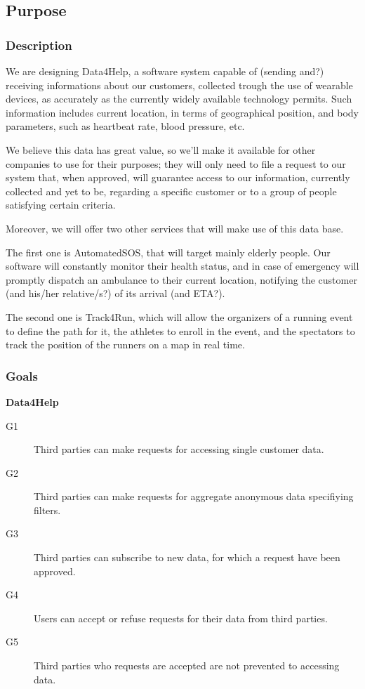 \documentclass[../main.tex]{subfiles}
\begin{document}
\subsection{Purpose}

\subsubsection{Description}
We are designing Data4Help, a software system capable of (sending and?) receiving informations about our customers, collected trough the use of wearable devices, as accurately as the currently widely available technology permits.
Such information includes current location, in terms of geographical position, and body parameters, such as heartbeat rate, blood pressure, etc.

We believe this data has great value, so we'll make it available for other companies to use for their purposes; they will only need to file a request to our system that, when approved, will guarantee access to our information, currently collected and yet to be, regarding a specific customer or to a group of people satisfying certain criteria.

Moreover, we will offer two other services that will make use of this data base.

The first one is AutomatedSOS, that will target mainly elderly people. Our software will constantly monitor their health status, and in case of emergency will promptly dispatch an ambulance to their current location, notifying the customer (and his/her relative/s?) of its arrival (and ETA?).

The second one is Track4Run, which will allow the organizers of a running event to define the path for it, the athletes to enroll in the event, and the spectators to track the position of the runners on a map in real time.


\subsubsection{Goals}


{\bf Data4Help}
\begin{description}
	\item [G1]  Third parties can make requests for accessing single customer data.
	\item [G2]  Third parties can make requests for aggregate anonymous data specifiying filters.
	\item [G3]	Third parties can subscribe to new data, for which a request have been approved.
	\item [G4]  Users can accept or refuse requests for their data from third parties.  
	\item [G5]  Third parties who requests are accepted are not prevented to accessing data.
\end{description}
\end{document}
